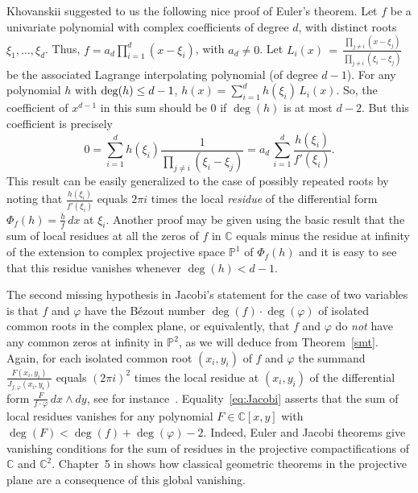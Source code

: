 \documentclass[a4paper,11pt]{amsart}
\newcommand{\C}{\mathbb{C}}
\renewcommand{\P}{\mathbb{P}}
\numberwithin{thm}{section}
\numberwithin{equation}{section}
\theoremstyle{definition}
\theoremstyle{plain}
\begin{document}
 Khovanskii suggested to us the following nice proof of Euler's theorem. 
 Let $f$ be a univariate polynomial with complex coefficients of degree $d$, with distinct roots $\xi_1, \dots, \xi_d$. Thus, $f= a_d \prod_{i=1}^d (x - \xi_i)$, with $a_d\neq 0$.
Let $L_i(x) \, = \, \frac {\prod_{ j \not= i} (x- \xi_j)}{\prod_{ j \not= i}
(\xi_i - \xi_j)}$ be the associated Lagrange
interpolating polynomial  (of degree $d-1$).
For any polynomial $h$ with ${\rm deg}(h) \leq d-1$,
$h(x) = \sum_{i=1}^d h(\xi_i) \, L_i(x)$.
So, the coefficient of $x^{d-1}$ in this sum
should be $0$ if  $ \deg(h)$ is at most $d-2$. But this coefficient is precisely
$$ {0} = \sum_{i=1}^d h(\xi_i) \frac 1 {\prod_{ j \not= i} (\xi_i - \xi_j)} = a_d
\,
 \sum_{i=1}^d \frac {h(\xi_i)} {f'(\xi_i)}.$$
This result can be easily generalized to the case of possibly repeated roots by noting that
$\frac {h(\xi_i)} {f'(\xi_i)}$ equals $ 2 \pi i$ times the local {\em residue} of the differential form 
$\Phi_f(h) =\frac h f \, dx$ at $\xi_i$.  Another proof may be given using the basic result that the sum of local residues
at all the zeros of $f$ in $\mathbb C$ equals minus the residue at infinity of the extension to complex projective space $\P^1$ of $\Phi_f(h)$
and it is easy to see that this residue vanishes whenever $\deg(h) < d-1$.

The second missing hypothesis in Jacobi's statement for the case of two variables is that $f$ and $\varphi$ 
have the B\'ezout number  $\deg(f)\cdot \deg(\varphi)$ of isolated common roots in the complex plane, or equivalently, that $f$ and $\varphi$  do {\em not} have any
common zeros at infinity in $\mathbb {P}^2$, as we will deduce from Theorem~\ref{smt}.  
Again, for each isolated common root $(x_i,y_i)$ of $f$ and $\varphi$ the summand $\frac{F(x_i,y_i)}{J_{f, \varphi} (x_i,y_i)}$ equals $(2 \pi i)^2$
times the local residue at $(x_i,y_i)$ of the differential form $\frac F {f \cdot \varphi} \, dx \wedge dy$, see for instance~\cite{CD05a,GH78}. 
 Equality~\eqref{eq:Jacobi} asserts that the sum of local residues
vanishes for any polynomial $F \in \C[x,y]$ with $\deg(F) < \deg(f) + \deg(\varphi) -2$. Indeed, Euler and Jacobi theorems give vanishing conditions 
for the sum of residues in the projective  compactifications of $\C$ and $\C^2$. Chapter~5 in \cite{GH78} shows how classical geometric
theorems in the projective plane are a consequence of this global vanishing.
\end{document}
